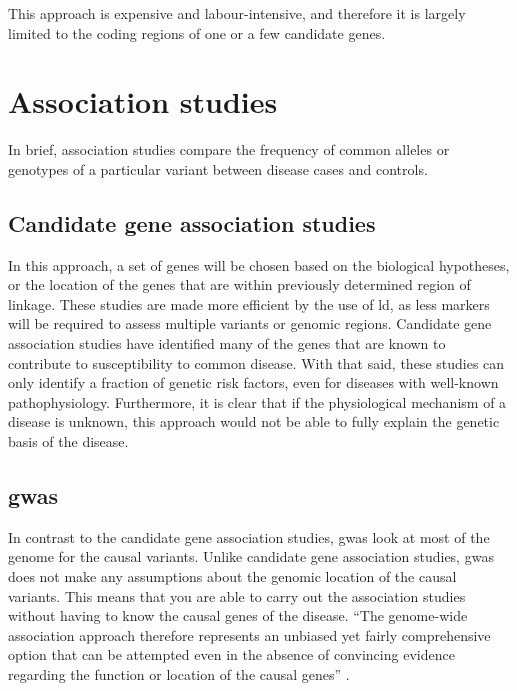 This approach is expensive and labour-intensive, and therefore it is largely limited to the coding regions of one or a few candidate genes.

\section{Association studies}
\label{sec:association_studies}

In brief, association studies compare the frequency of common alleles or genotypes of  a particular variant between disease cases and controls.

\subsection{Candidate gene association studies}
\label{sub:candidate_gene_association_studies}

In this approach, a set of genes will be chosen based on the biological hypotheses, or the location of the genes that are within previously determined region of linkage.
These studies are made more efficient by the use of \gls{ld}, as less markers will be required to assess multiple variants or genomic regions.
Candidate gene association studies have identified many of the genes that are known to contribute to susceptibility to common disease.
With that said, these studies can only identify  a fraction of genetic risk factors, even for diseases with well-known pathophysiology.
Furthermore, it is clear that if the physiological mechanism of a disease is unknown, this approach would not be able to fully explain the genetic basis of the disease.

\subsection{\Acrfull{gwas}}
\label{sub:gwas}

In contrast to the candidate gene association studies, \gls{gwas} look at most of the genome for the causal variants.
Unlike candidate gene association studies, \gls{gwas} does not make any assumptions about the genomic location of the causal variants.
This means that you are able to carry out the association studies without having to know the causal genes of the disease.
``The genome-wide association approach therefore represents an unbiased yet fairly comprehensive option that can be attempted even in the absence of convincing evidence regarding the function or location of the causal genes'' \citep{Hirschhorn2005}.

